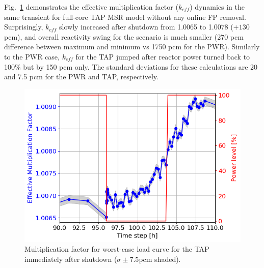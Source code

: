 \documentclass{anstrans}
\begin{document}
Fig.~\ref{fig:tap_keff} demonstrates the effective multiplication factor 
($k_{eff}$) dynamics in the same transient for full-core \gls{TAP} \gls{MSR} 
model without any online \gls{FP} removal. Surprisingly, $k_{eff}$ slowly 
increased after shutdown from 1.0065 to 1.0078 ($+130$ pcm), and overall  
reactivity swing for the scenario is much smaller (270 pcm difference between 
maximum and minimum vs 1750 pcm for the \gls{PWR}). Similarly to the \gls{PWR} 
case, $k_{eff}$ for the \gls{TAP} jumped after reactor power turned back to 
100\% but by 150 pcm only. The standard deviations for these
calculations are  
20 and 7.5 pcm for the \gls{PWR} and \gls{TAP}, respectively. 
\begin{figure}[htbp!] %
	\centering
	\includegraphics[width=1.06\linewidth]{tap_keff_zoomed.png}
	\caption{Multiplication factor for worst-case load curve for the \gls{TAP} 
	immediately after shutdown ($\sigma\pm7.5$pcm shaded).}
	\label{fig:tap_keff}
\end{figure}
\end{document}
